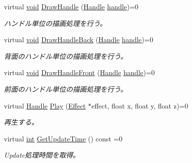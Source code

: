 \begin{DoxyCompactItemize}
virtual \mbox{\hyperlink{namespace_effekseer_ab34c4088e512200cf4c2716f168deb56}{void}} \mbox{\hyperlink{class_effekseer_1_1_manager_a9eaa0c0f968351b53c46f9735cc40a79}{Draw\+Handle}} (\mbox{\hyperlink{namespace_effekseer_afba58b8d812da862190e9bbfc040824a}{Handle}} \mbox{\hyperlink{namespace_effekseer_afd99b336b206999bdcca3e431648efbc}{handle}})=0
\begin{DoxyCompactList}\small\item\em ハンドル単位の描画処理を行う。 \end{DoxyCompactList}\item 
virtual \mbox{\hyperlink{namespace_effekseer_ab34c4088e512200cf4c2716f168deb56}{void}} \mbox{\hyperlink{class_effekseer_1_1_manager_ab1c00890b1e6f88f0fcd159f32ff0f84}{Draw\+Handle\+Back}} (\mbox{\hyperlink{namespace_effekseer_afba58b8d812da862190e9bbfc040824a}{Handle}} \mbox{\hyperlink{namespace_effekseer_afd99b336b206999bdcca3e431648efbc}{handle}})=0
\begin{DoxyCompactList}\small\item\em 背面のハンドル単位の描画処理を行う。 \end{DoxyCompactList}\item 
virtual \mbox{\hyperlink{namespace_effekseer_ab34c4088e512200cf4c2716f168deb56}{void}} \mbox{\hyperlink{class_effekseer_1_1_manager_a684708df101f9fdcf81096dcb058bce2}{Draw\+Handle\+Front}} (\mbox{\hyperlink{namespace_effekseer_afba58b8d812da862190e9bbfc040824a}{Handle}} \mbox{\hyperlink{namespace_effekseer_afd99b336b206999bdcca3e431648efbc}{handle}})=0
\begin{DoxyCompactList}\small\item\em 前面のハンドル単位の描画処理を行う。 \end{DoxyCompactList}\item 
virtual \mbox{\hyperlink{namespace_effekseer_afba58b8d812da862190e9bbfc040824a}{Handle}} \mbox{\hyperlink{class_effekseer_1_1_manager_a5ea3211a3670843061238976dda54a4f}{Play}} (\mbox{\hyperlink{class_effekseer_1_1_effect}{Effect}} $\ast$effect, float x, float y, float z)=0
\begin{DoxyCompactList}\small\item\em 再生する。 \end{DoxyCompactList}\item 
virtual \mbox{\hyperlink{namespace_effekseer_ace0abf7c2e6947e519ebe8b54cbcc30a}{int}} \mbox{\hyperlink{class_effekseer_1_1_manager_a0f5a05a0911243b56fe6aaa259d677df}{Get\+Update\+Time}} () const =0
\begin{DoxyCompactList}\small\item\em Update処理時間を取得。 \end{DoxyCompactList}\item 

\end{DoxyCompactItemize}
